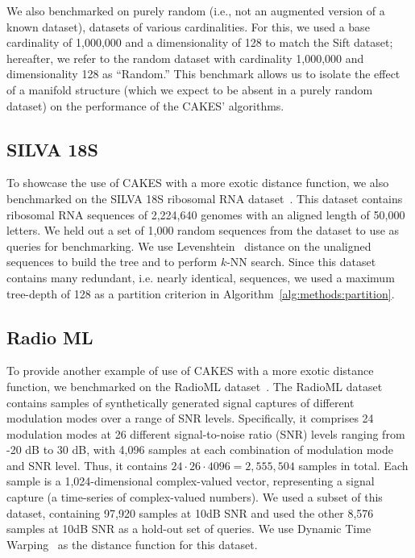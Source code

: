 We also benchmarked on purely random (i.e., not an augmented version of a known dataset), datasets of various cardinalities.
For this, we used a base cardinality of 1,000,000 and a dimensionality of 128 to match the Sift dataset; hereafter, we refer to the random dataset with cardinality 1,000,000 and dimensionality 128 as ``Random.'' 
This benchmark allows us to isolate the effect of a manifold structure (which we expect to be absent in a purely random dataset) on the performance of the CAKES' algorithms. 


\subsection{SILVA 18S}
\label{sec:datasets-and-benchmarks:silva-18s}

To showcase the use of CAKES with a more exotic distance function, we also benchmarked on the SILVA 18S ribosomal RNA dataset~\cite{10.1093/nar/gks1219}.
This dataset contains ribosomal RNA sequences of 2,224,640 genomes with an aligned length of 50,000 letters.
We held out a set of 1,000 random sequences from the dataset to use as queries for benchmarking.
We use Levenshtein~\cite{levenshtein1966binary} distance on the unaligned sequences to build the tree and to perform $k$-NN search.
Since this dataset contains many redundant, i.e. nearly identical, sequences, we used a maximum tree-depth of 128 as a partition criterion in Algorithm~\ref{alg:methods:partition}.


\subsection{Radio ML}
\label{sec:datasets-and-benchmarks:radio-ml}

To provide another example of use of CAKES with a more exotic distance function, we benchmarked on the RadioML dataset~\cite{oshea2018radioml}.
The RadioML dataset contains samples of synthetically generated signal captures of different modulation modes over a range of SNR levels.
Specifically, it comprises 24 modulation modes at 26 different signal-to-noise ratio (SNR) levels ranging from -20 dB to 30 dB, with 4,096 samples at each combination of modulation mode and SNR level.
Thus, it contains $24 \cdot 26 \cdot 4096 = 2,555,504$ samples in total.
Each sample is a 1,024-dimensional complex-valued vector, representing a signal capture (a time-series of complex-valued numbers).
We used a subset of this dataset, containing 97,920 samples at 10dB SNR and used the other 8,576 samples at 10dB SNR as a hold-out set of queries.
We use Dynamic Time Warping~\cite{muller2007dynamic} as the distance function for this dataset.


